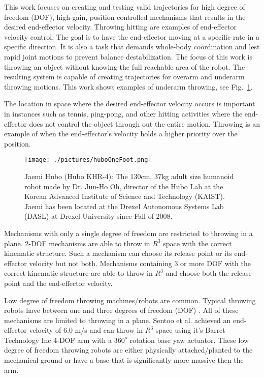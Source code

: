 This work focuses on creating and testing valid trajectories for high degree of freedom (DOF), high-gain, position controlled mechanisms that results in the desired end-effector velocity.  Throwing hitting are examples of end-effector velocity control.  The goal is to have the end-effector moving at a specific rate in a specific direction.  It is also a task that demands whole-body coordination and lest rapid joint motions to prevent balance destabilization.  The focus of this work is throwing an object without knowing the full reachable area of the robot.  The resulting system is capable of creating trajectories for overarm and underarm throwing motions.  This work shows examples of underarm throwing, see Fig.~\ref{fig:huboOneFoot}.

The location in space where the desired end-effector velocity occurs is important in instances such as tennis, ping-pong, and other hitting activities where the end-effector does not control the object through out the entire motion.  Throwing is an example of when the end-effector's velocity holds a higher priority over the position.  

\begin{figure}[thpb]\label{fig:huboOneFoot}
  \centering
\texttt{[image: ./pictures/huboOneFoot.png]}
  \caption{Jaemi Hubo (Hubo KHR-4): The 130cm, 37kg adult size humanoid robot made by Dr. Jun-Ho Oh, director of the Hubo Lab at the Korean Advanced Institute of Science and Technology (KAIST).  Jaemi has been located at the Drexel Autonomous Systems Lab (DASL) at Drexel University since Fall of 2008. }
\end{figure}

Mechanisms with only a single degree of freedom are restricted to throwing in a plane.   2-DOF mechanisms are able to throw in $R^3$ space with the correct kinematic structure.  Such a mechanism can choose its release point or its end-effector velocity but not both.  Mechanisms containing 3 or more DOF with the correct kinematic structure are able to throw in $R^3$ and choose both the release point and the end-effector velocity.  

Low degree of freedom throwing machines/robots are common.  Typical throwing robots have between one and three degrees of freedom (DOF) \cite{509405, Lynch97dynamicnonprehensile, 5152525, 509335, springerlink:10.1007/s10015-006-0401-0}.  All of these mechanisms are limited to throwing in a plane.   Sentoo et al.\cite{4651142} achieved an end-effector velocity of 6.0 m/s and can throw in $R^3$ space using it's Barret Technology Inc 4-DOF arm with a $360^o$ rotation base yaw actuator.  These low degree of freedom throwing robots are either physically attached/planted to the mechanical ground or have a base that is significantly more massive then the arm.  

